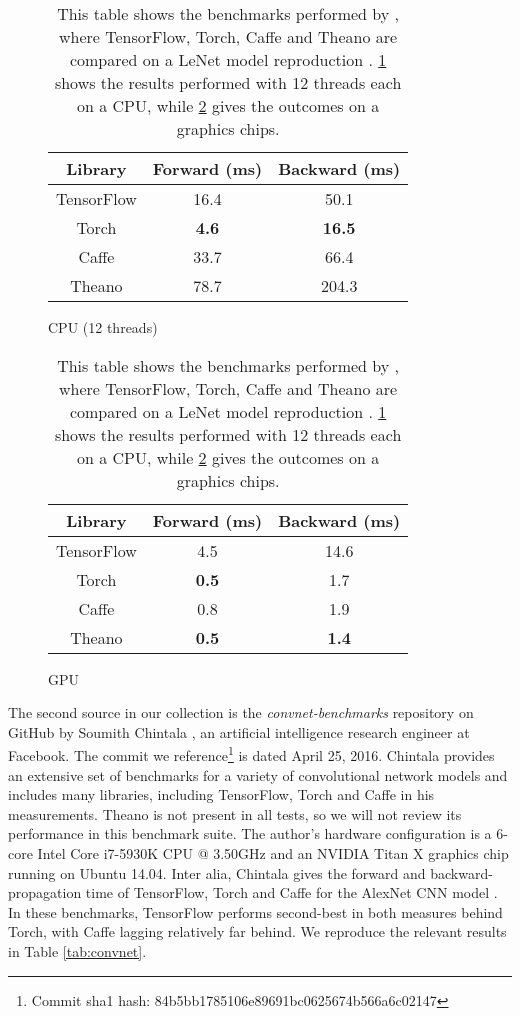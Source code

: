 \begin{table}
  \begin{subfigure}[h]{0.49\textwidth}
    \centering
    \begin{tabular}{ccc}
      \textbf{Library} & \textbf{Forward (ms)} & \textbf{Backward (ms)}
      \\ \toprule
      TensorFlow & 16.4 & 50.1
      \\
      Torch & \textbf{4.6} & \textbf{16.5}
      \\
      Caffe & 33.7 & 66.4
      \\
      Theano & 78.7 & 204.3
      \\ \bottomrule
    \end{tabular}
    \caption{CPU (12 threads)}
  \label{tab:bosch-a}
  \end{subfigure}

  \vspace{0.5cm}

  \begin{subfigure}[h]{0.49\textwidth}
    \centering
    \begin{tabular}{ccc}
      \textbf{Library} & \textbf{Forward (ms)} & \textbf{Backward (ms)}
      \\ \toprule
      TensorFlow & 4.5 & 14.6
      \\
      Torch & \textbf{0.5} & 1.7
      \\
      Caffe & 0.8 & 1.9
      \\
      Theano & \textbf{0.5} & \textbf{1.4}
      \\ \bottomrule
    \end{tabular}
    \caption{GPU}
    \label{tab:bosch-b}
  \end{subfigure}
  \caption{This table shows the benchmarks performed by \cite{bosch}, where
    TensorFlow, Torch, Caffe and Theano are compared on a LeNet model
    reproduction \cite{lenet}. \ref{tab:bosch-a} shows the results performed
    with 12 threads each on a CPU, while \ref{tab:bosch-b} gives the outcomes on
    a graphics chips.}
  \label{tab:bosch}
\end{table}

The second source in our collection is the \emph{convnet-benchmarks} repository
on GitHub by Soumith Chintala \cite{convnet-bench}, an artificial intelligence
research engineer at Facebook. The commit we reference\footnote{Commit sha1
  hash: 84b5bb1785106e89691bc0625674b566a6c02147} is dated April 25,
2016. Chintala provides an extensive set of benchmarks for a variety of
convolutional network models and includes many libraries, including TensorFlow,
Torch and Caffe in his measurements. Theano is not present in all tests, so we
will not review its performance in this benchmark suite. The author's hardware
configuration is a 6-core Intel Core i7-5930K CPU @ 3.50GHz and an NVIDIA Titan
X graphics chip running on Ubuntu 14.04. Inter alia, Chintala gives the forward
and backward-propagation time of TensorFlow, Torch and Caffe for the AlexNet CNN
model \cite{alexnet}. In these benchmarks, TensorFlow performs second-best in
both measures behind Torch, with Caffe lagging relatively far behind. We
reproduce the relevant results in Table \ref{tab:convnet}.

